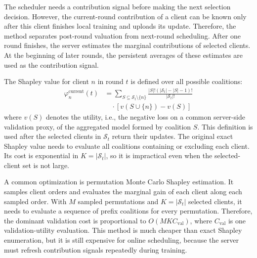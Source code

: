 \documentclass[journal]{IEEEtran}
\begin{document}
The scheduler needs a contribution signal before making the next selection decision. However, the current-round contribution of a client can be known only after this client finishes local training and uploads its update. Therefore, the method separates post-round valuation from next-round scheduling. After one round finishes, the server estimates the marginal contributions of selected clients. At the beginning of later rounds, the persistent averages of these estimates are used as the contribution signal.

The Shapley value for client $n$ in round $t$ is defined over all possible coalitions:
\begin{equation}
\begin{aligned}
\varphi_n^{\text{current}}(t)
&= \sum_{S \subseteq \mathcal{S}_t \setminus \{n\}}
\frac{|S|!(|\mathcal{S}_t| - |S| - 1)!}{|\mathcal{S}_t|!} \\
&\quad \cdot \left[v(S \cup \{n\}) - v(S)\right]
\end{aligned}
\end{equation}
where $v(S)$ denotes the utility, i.e., the negative loss on a common server-side validation proxy, of the aggregated model formed by coalition $S$. This definition is used after the selected clients in $\mathcal{S}_t$ return their updates. The original exact Shapley value needs to evaluate all coalitions containing or excluding each client. Its cost is exponential in $K=|\mathcal{S}_t|$, so it is impractical even when the selected-client set is not large.

A common optimization is permutation Monte Carlo Shapley estimation. It samples client orders and evaluates the marginal gain of each client along each sampled order. With $M$ sampled permutations and $K=|\mathcal{S}_t|$ selected clients, it needs to evaluate a sequence of prefix coalitions for every permutation. Therefore, the dominant validation cost is proportional to $O(MK C_{\mathrm{val}})$, where $C_{\mathrm{val}}$ is one validation-utility evaluation. This method is much cheaper than exact Shapley enumeration, but it is still expensive for online scheduling, because the server must refresh contribution signals repeatedly during training.
\end{document}
